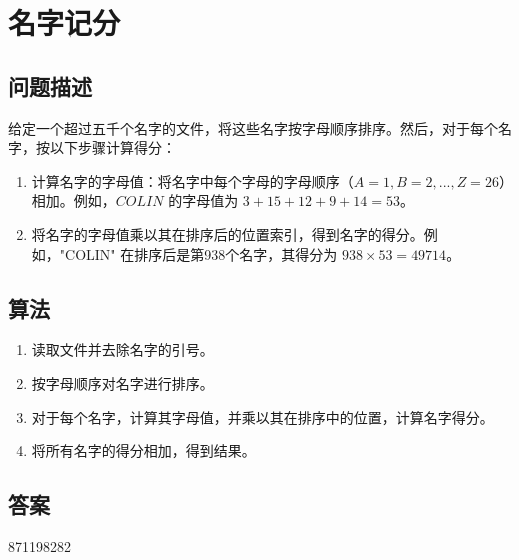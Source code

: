 \section{名字记分}
\subsection{问题描述}
\begin{tcolorbox}

给定一个超过五千个名字的文件，将这些名字按字母顺序排序。然后，对于每个名字，按以下步骤计算得分：

\begin{enumerate}
    \item 计算名字的字母值：将名字中每个字母的字母顺序（$A=1, B=2, ..., Z=26$）相加。例如，$COLIN$ 的字母值为 $3 + 15 + 12 + 9 + 14 = 53$。
    \item 将名字的字母值乘以其在排序后的位置索引，得到名字的得分。例如，"COLIN" 在排序后是第938个名字，其得分为 $938 \times 53 = 49714$。
\end{enumerate}
\end{tcolorbox}

\subsection{算法}
\begin{enumerate}
    \item 读取文件并去除名字的引号。
    \item 按字母顺序对名字进行排序。
    \item 对于每个名字，计算其字母值，并乘以其在排序中的位置，计算名字得分。
    \item 将所有名字的得分相加，得到结果。
\end{enumerate}

\subsection{答案}
871198282
